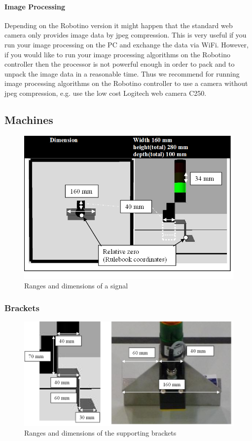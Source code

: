 \documentclass[12pt,twoside]{article}
\begin{document}
\begin{appendix}
\paragraph{Image Processing}

Depending on the Robotino version it might happen that the standard web
camera only provides image data by jpeg compression. This is very
useful if you run your image processing on the PC and exchange the data
via WiFi. However, if you would like to run your image processing
algorithms on the Robotino controller then the processor is not
powerful enough in order to pack and to unpack the image data in a
reasonable time. Thus we recommend for running image processing
algorithms on the Robotino controller to use a camera without jpeg
compression, e.g. use the low cost Logitech web camera C250.

\subsection{Machines} \label{abx:sec:machine}

\begin{figure}[h]
	\centering
	\includegraphics[width=.5\textwidth]{machine_measures.png}
	\caption{Ranges and dimensions of a signal}
	\label{apx:fig:machinemeasures}
\end{figure}

\subsubsection{Brackets}

\begin{figure}[h]
	\centering
	\includegraphics[width=.5\textwidth]{bracket.png}
	\caption{Ranges and dimensions of the supporting brackets}
	\label{apx:fig:brackets}
\end{figure}


\end{appendix}
\end{document}
